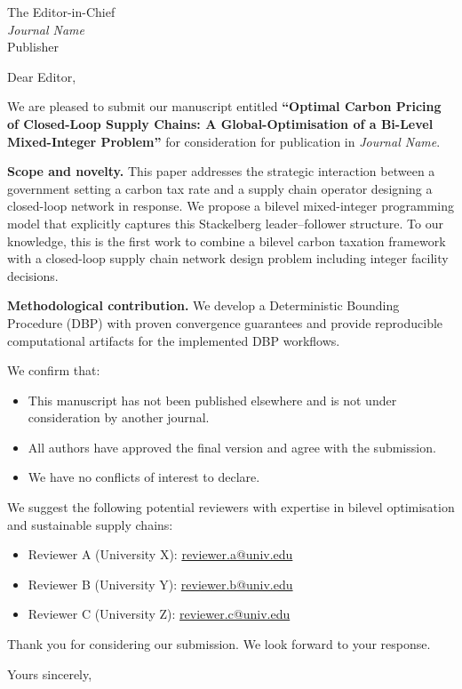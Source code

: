 \documentclass[12pt, a4paper]{letter}
\begin{document}
\begin{letter}{The Editor-in-Chief\\
               \textit{Journal Name}\\
               Publisher}

\opening{Dear Editor,}

We are pleased to submit our manuscript entitled
\textbf{``Optimal Carbon Pricing of Closed-Loop Supply Chains:
A Global-Optimisation of a Bi-Level Mixed-Integer Problem''} for consideration for publication in
\textit{Journal Name}.

\textbf{Scope and novelty.}
This paper addresses the strategic interaction between a government
setting a carbon tax rate and a supply chain operator designing a
closed-loop network in response.
We propose a bilevel mixed-integer programming model that explicitly
captures this Stackelberg leader--follower structure.
To our knowledge, this is the first work to combine a bilevel
carbon taxation framework with a closed-loop supply chain network
design problem including integer facility decisions.

\textbf{Methodological contribution.}
We develop a Deterministic Bounding Procedure (DBP) with proven
convergence guarantees and provide reproducible computational
artifacts for the implemented DBP workflows.

We confirm that:
\begin{itemize}
  \item This manuscript has not been published elsewhere and is not
        under consideration by another journal.
  \item All authors have approved the final version and agree with
        the submission.
  \item We have no conflicts of interest to declare.
\end{itemize}

We suggest the following potential reviewers with expertise in
bilevel optimisation and sustainable supply chains:
\begin{itemize}
  \item Reviewer A (University X):
        \href{mailto:reviewer.a@univ.edu}{reviewer.a@univ.edu}
  \item Reviewer B (University Y):
        \href{mailto:reviewer.b@univ.edu}{reviewer.b@univ.edu}
  \item Reviewer C (University Z):
        \href{mailto:reviewer.c@univ.edu}{reviewer.c@univ.edu}
\end{itemize}

Thank you for considering our submission.
We look forward to your response.

\closing{Yours sincerely,}
\end{letter}
\end{document}
